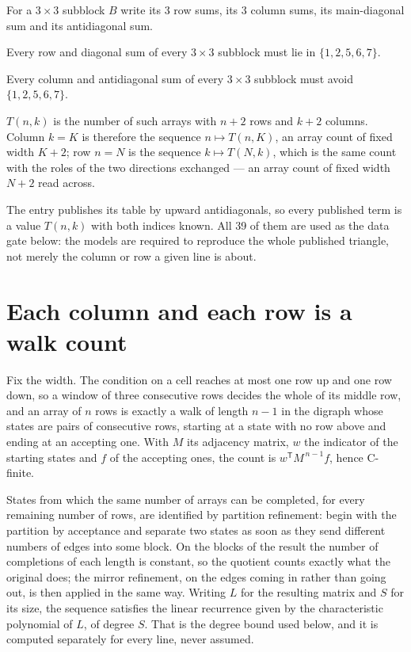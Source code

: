 \documentclass[11pt]{article}
\theoremstyle{definition}
\begin{document}
For a $3\times3$ subblock $B$ write its 3 row sums, its 3 column sums, its main-diagonal sum and its antidiagonal sum.

Every row and diagonal sum of every $3\times3$ subblock must lie in $\{1, 2, 5, 6, 7\}$.

Every column and antidiagonal sum of every $3\times3$ subblock must avoid $\{1, 2, 5, 6, 7\}$.

$T(n,k)$ is the number of such arrays with $n + 2$ rows and $k + 2$ columns. Column $k = K$ is therefore the sequence $n \mapsto T(n,K)$, an array count of fixed width $K + 2$; row $n = N$ is the sequence $k \mapsto T(N,k)$, which is the same count with the roles of the two directions exchanged --- an array count of fixed width $N + 2$ read across.

The entry publishes its table by upward antidiagonals, so every published term is a value $T(n,k)$ with both indices known. All 39 of them are used as the data gate below: the models are required to reproduce the whole published triangle, not merely the column or row a given line is about.

\section{Each column and each row is a walk count}

Fix the width. The condition on a cell reaches at most one row up and one row down, so a window of three consecutive rows decides the whole of its middle row, and an array of $n$ rows is exactly a walk of length $n-1$ in the digraph whose states are pairs of consecutive rows, starting at a state with no row above and ending at an accepting one. With $M$ its adjacency matrix, $w$ the indicator of the starting states and $f$ of the accepting ones, the count is $w^{\mathsf T}M^{\,n-1}f$, hence C-finite.

States from which the same number of arrays can be completed, for every remaining number of rows, are identified by partition refinement: begin with the partition by acceptance and separate two states as soon as they send different numbers of edges into some block. On the blocks of the result the number of completions of each length is constant, so the quotient counts exactly what the original does; the mirror refinement, on the edges coming in rather than going out, is then applied in the same way. Writing $L$ for the resulting matrix and $S$ for its size, the sequence satisfies the linear recurrence given by the characteristic polynomial of $L$, of degree $S$. That is the degree bound used below, and it is computed separately for every line, never assumed.
\end{document}
